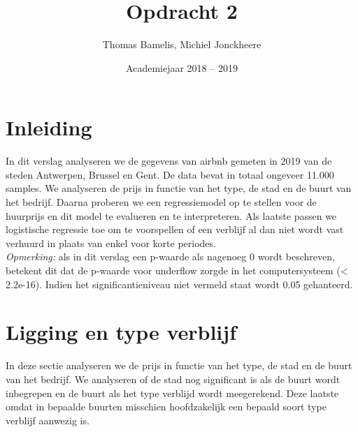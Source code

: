 \documentclass[a4paper,kulak]{kulakarticle} %
\date{Academiejaar 2018 -- 2019}
\title{Opdracht 2}
\author{Thomas Bamelis, Michiel Jonckheere}
\begin{document}
\maketitle

\section*{Inleiding}
In dit verslag analyseren we de gegevens van airbnb gemeten in 2019 van de steden Antwerpen, Brussel en Gent. 
De data bevat in totaal ongeveer 11.000 samples.
We analyseren de prijs in functie van het type, de stad en de buurt van het bedrijf.
Daarna proberen we een regressiemodel op te stellen voor de huurprijs en dit model te evalueren en te interpreteren.
Als laatste passen we logistische regressie toe om te voorspellen of een verblijf al dan niet wordt vast verhuurd in plaats van enkel voor korte periodes.\\
\textit{Opmerking:} als in dit verslag een p-waarde als nagenoeg 0 wordt beschreven, betekent dit dat de p-waarde voor underflow zorgde in het computersysteem (< 2.2e-16).
Indien het significantieniveau niet vermeld staat wordt 0.05 gehanteerd.

\section{Ligging en type verblijf}
In deze sectie analyseren we de prijs in functie van het type, de stad en de buurt van het bedrijf.
We analyseren of de stad nog significant is als de buurt wordt inbegrepen en de buurt als het type verblijd wordt meegerekend.
Deze laatste omdat in bepaalde buurten misschien hoofdzakelijk een bepaald soort type verblijf aanwezig is.
\end{document}
